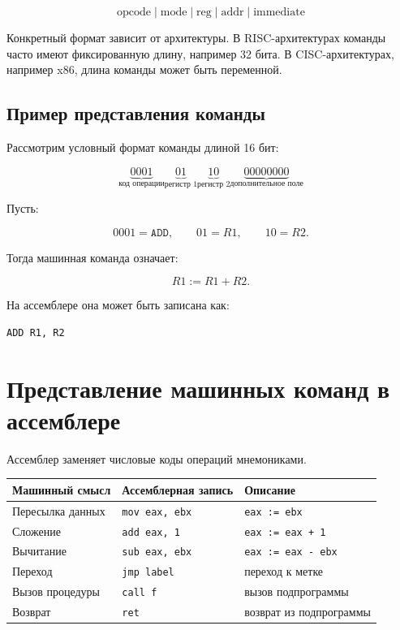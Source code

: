 \documentclass[12pt,a4paper]{article}
\begin{document}
\[
\boxed{
\text{opcode}
\mid
\text{mode}
\mid
\text{reg}
\mid
\text{addr}
\mid
\text{immediate}
}
\]

Конкретный формат зависит от архитектуры. В RISC-архитектурах команды часто имеют фиксированную длину, например 32 бита. В CISC-архитектурах, например x86, длина команды может быть переменной.

\subsection{Пример представления команды}

Рассмотрим условный формат команды длиной 16 бит:

\[
\underbrace{0001}_{\text{код операции}}
\underbrace{01}_{\text{регистр 1}}
\underbrace{10}_{\text{регистр 2}}
\underbrace{00000000}_{\text{дополнительное поле}}
\]

Пусть:

\[
0001 = \texttt{ADD}, \qquad
01 = R1, \qquad
10 = R2.
\]

Тогда машинная команда означает:

\[
R1 := R1 + R2.
\]

На ассемблере она может быть записана как:

\begin{lstlisting}
ADD R1, R2
\end{lstlisting}

\section{Представление машинных команд в ассемблере}

Ассемблер заменяет числовые коды операций мнемониками.

\begin{center}
\begin{tabular}{lll}
\toprule
Машинный смысл & Ассемблерная запись & Описание \\
\midrule
Пересылка данных & \texttt{mov eax, ebx} & \texttt{eax := ebx} \\
Сложение & \texttt{add eax, 1} & \texttt{eax := eax + 1} \\
Вычитание & \texttt{sub eax, ebx} & \texttt{eax := eax - ebx} \\
Переход & \texttt{jmp label} & переход к метке \\
Вызов процедуры & \texttt{call f} & вызов подпрограммы \\
Возврат & \texttt{ret} & возврат из подпрограммы \\
\bottomrule
\end{tabular}
\end{center}
\end{document}
